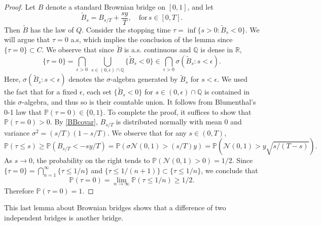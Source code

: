 \begin{proof}
	Let $B$ denote a standard Brownian bridge on $[0,1]$, and let 
	\[
	\tilde{B}_s = B_{s/T} + \frac{sy}{T}, \quad \mathrm{for}\,s\in[0,T].
	\]
	Then $\tilde{B}$ has the law of $Q$. Consider the stopping time $\tau = \inf\{s>0 : \tilde{B}_s < 0 \}$. We will argue that $\tau = 0$ a.s, which implies the conclusion of the lemma since $\{\tau = 0\} \subset C$. We observe that since $\tilde{B}$ is a.s. continuous and $\mathbb{Q}$ is dense in $\mathbb{R}$,
	\[
	\{\tau = 0\} = \bigcap_{\epsilon > 0}\,\bigcup_{s\in(0,\epsilon)\cap\mathbb{Q}} \{\tilde{B}_s < 0 \} \in \bigcap_{\epsilon > 0} \sigma(\tilde{B}_s : s<\epsilon).
	\]
	Here, $\sigma(\tilde{B}_s : s<\epsilon)$ denotes the $\sigma$-algebra generated by $\tilde{B}_s$ for $s<\epsilon$. We used the fact that for a fixed $\epsilon$, each set $\{\tilde{B}_s < 0\}$ for $s\in (0,\epsilon)\cap\mathbb{Q}$ is contained in this $\sigma$-algebra, and thus so is their countable union. It follows from Blumenthal's 0-1 law \cite[Theorem 7.2.3]{Durrett} that $\mathbb{P}(\tau = 0) \in \{0,1\}$. To complete the proof, it suffices to show that $\mathbb{P}(\tau = 0) > 0$. By \eqref{BBcovar}, $B_{s/T}$ is distributed normally with mean 0 and variance $\sigma^2 = (s/T)(1-s/T)$. We observe that for any $s\in(0,T)$, 
	\[
	\mathbb{P}(\tau\leq s) \geq \mathbb{P}(B_{s/T} < -sy/T) = \mathbb{P}\left(\sigma\mathcal{N}(0,1) > (s/T)y\right) = \mathbb{P}\left(\mathcal{N}(0,1) > y\sqrt{s/(T-s)}\right).
	\]
	As $s\to 0$, the probability on the right tends to $\mathbb{P}(\mathcal{N}(0,1) > 0) = 1/2$. Since $\{\tau = 0\} = \bigcap_{n=1}^\infty \{\tau \leq 1/n\}$ and $\{\tau\leq 1/(n+1)\} \subset \{\tau \leq 1/n\}$, we conclude that
	\[
	\mathbb{P}(\tau = 0) = \lim_{n\to\infty} \mathbb{P}(\tau \leq 1/n) \geq 1/2.
	\]
	Therefore $\mathbb{P}(\tau = 0) = 1$.
	
\end{proof}	

This last lemma about Brownian bridges shows that a difference of two independent bridges is another bridge.

